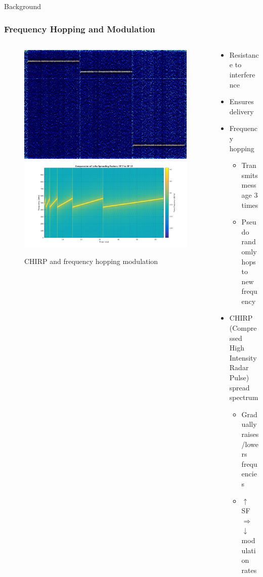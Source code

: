 \documentclass{beamer}
\begin{document}
\begin{frame}{Background}
  \frametitle{Frequency Hopping and Modulation}
  \begin{columns}
    \begin{column}{0.5\textwidth}
      \begin{figure}[htbp]
        \centering
        \includegraphics[width=.7\textwidth]{images/Sigfox_Spectrum_Analysis.jpg}
        \includegraphics[width=.9\textwidth]{images/Chirp.png}
        \caption{CHIRP and frequency hopping modulation}
        \label{fig:Frequency_hopping_and_modulation}
      \end{figure}
  \end{column}
    \begin{column}{0.5\textwidth}
      \begin{itemize}
        \item Resistance to interference
        \item Ensures delivery
        \item Frequency hopping
          \begin{itemize}
            \item Transmits message 3 times
            \item Pseudo randomly hops to new frequency
          \end{itemize}
        \item CHIRP (Compressed High Intensity Radar Pulse) spread spectrum
          \begin{itemize}
            \item Gradually raises/lowers frequencies
            \item $\uparrow$ SF $\Rightarrow$ $\downarrow$ modulation rates
          \end{itemize}
      \end{itemize}
    \end{column}
  \end{columns}
\end{frame}
\end{document}
